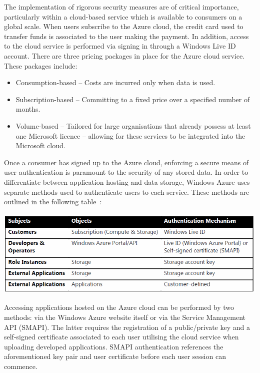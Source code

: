 The implementation of rigorous security measures are of critical importance, particularly within a cloud-based service which is available to consumers on a global scale. When users subscribe to the Azure cloud, the credit card used to transfer funds is associated to the user making the payment. In addition, access to the cloud service is performed via signing in through a Windows Live ID account. 
There are three pricing packages\ftAthree{} in place for the Azure cloud service. These packages include:\ftAthreeText
\begin{itemize}
\item Consumption-based -- Costs are incurred only when data is used.
\item Subscription-based -- Committing to a fixed price over a specified number of months.
\item Volume-based -- Tailored for large organisations that already possess at least one Microsoft licence -- allowing for these services to be integrated into the Microsoft cloud. 
\end{itemize}

Once a consumer has signed up to the Azure cloud, enforcing a secure means of user authentication is paramount to the security of any stored data. In order to differentiate between application hosting and data storage, Windows Azure uses separate methods used to authenticate users to each service. These methods are outlined in the following table~\cite{AzureSecurity}:

\begin{center}
\includegraphics[scale=0.6]{figs/AzureTable.png} \\
\end{center}

Accessing applications hosted on the Azure cloud can be performed by two methods: via the Windows Azure website itself or via the Service Management API (SMAPI). The latter requires the registration of a public/private key and a self-signed certificate associated to each user utilising the cloud service when uploading developed applications. SMAPI authentication references the aforementioned key pair and user certificate before each user session can commence.

